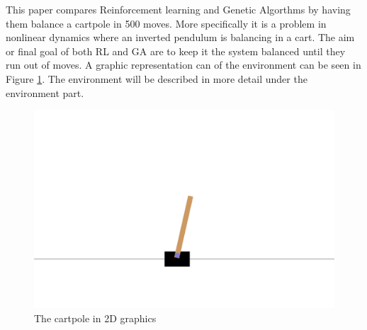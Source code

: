 This paper compares Reinforcement learning and Genetic Algorthms by having them balance a cartpole in 500 moves. More specifically it is a problem in nonlinear dynamics where an inverted pendulum is balancing in a cart. The aim or final goal of both RL and GA are to keep it the system balanced until they run out of moves. A graphic representation can of the environment can be seen in Figure \ref{figPOLE}. The environment will be described in more detail under the environment part.  
\begin{figure}[H]
    \centering
    \includegraphics [scale = 0.18]{Images/cartpole.png}
    \caption{The cartpole in 2D graphics}
    \label{figPOLE}
\end{figure}


